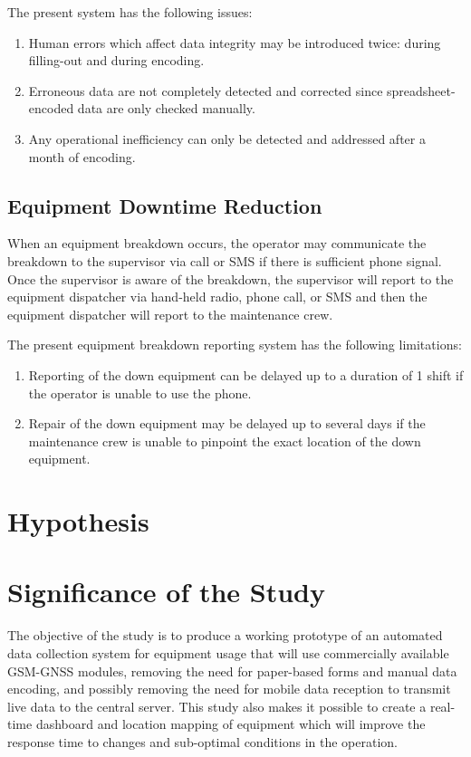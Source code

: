\documentclass[12pt]{report}
\begin{document}
The present system has the following issues:

\begin{enumerate}
\item Human errors which affect data integrity may be introduced twice: during filling-out and during encoding.
\item Erroneous data are not completely detected and corrected since spreadsheet-encoded data are only checked manually.
\item Any operational inefficiency can only be detected and addressed after a month of encoding.
\end{enumerate}

\subsection{Equipment Downtime Reduction}

When an equipment breakdown occurs, the operator may communicate the breakdown to the supervisor via call or SMS if there is sufficient phone signal.
Once the supervisor is aware of the breakdown, the supervisor will report to the equipment dispatcher via hand-held radio, phone call, or SMS and then the equipment dispatcher will report to the maintenance crew.

The present equipment breakdown reporting system has the following limitations:

\begin{enumerate}
\item Reporting of the down equipment can be delayed up to a duration of 1 shift if the operator is unable to use the phone.
\item Repair of the down equipment may be delayed up to several days if the maintenance crew is unable to pinpoint the exact location of the down equipment.
\end{enumerate}

\section{Hypothesis}

\section{Significance of the Study}

The objective of the study is to produce a working prototype of an automated data collection system for equipment usage that will use commercially available GSM-GNSS modules, removing the need for paper-based forms and manual data encoding, and possibly removing the need for mobile data reception to transmit live data to the central server.
This study also makes it possible to create a real-time dashboard and location mapping of equipment which will improve the response time to changes and sub-optimal conditions in the operation.
\end{document}
